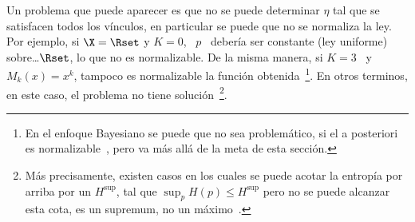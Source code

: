 Un problema que puede  aparecer es que no se puede determinar  $\eta$ tal que se
satisfacen todos los  v\'inculos, en particular se puede que  no se normaliza la
ley.  Por ejemplo,  si $\X = \Rset$ y  $K = 0$, \ $p$ \  deber\'ia ser constante
(ley  uniforme) sobre\ldots  $\Rset$, lo  que no  es normalizable.  De  la misma
manera, si $K  = 3$ \ y \  $M_k(x) = x^k$, tampoco es  normalizable la funci\'on
obtenida~\footnote{En el  enfoque Bayesiano se puede que  no sea problem\'atico,
  si el  a posteriori es normalizable~\cite{Rob07},  pero va m\'as  all\'a de la
  meta de  esta secci\'on.}.  En  otros terminos, en  este caso, el  problema no
tiene soluci\'on~\footnote{M\'as  precisamente, existen  casos en los  cuales se
  puede acotar la entrop\'ia por arriba  por un $H^{\sup}$, tal que $\sup_p H(p)
  \le H^{\sup}$ pero no  se puede alcanzar esta cota, \ie es  un supremum, no un
  m\'aximo~\cite[sec.~12.3]{CovTho06}.}.

